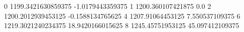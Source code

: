 0 1199.3421630859375 -1.0179443359375
1 1200.360107421875 0.0
2 1200.2012939453125 -0.1588134765625
4 1207.91064453125 7.550537109375
6 1219.3021240234375 18.9420166015625
8 1245.45751953125 45.097412109375

